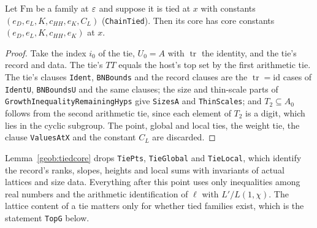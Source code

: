 \begin{lemma}\label{geob:tiedcore}
Let $\mathrm{Fm}$ be a family at $\varepsilon$ and suppose it is tied at $x$ with
constants $(e_D,e_L,K,c_{HH},e_K,C_L)$ (\texttt{ChainTied}). Then its core has
core constants $(e_D,e_L,K,c_{HH},e_K)$ at $x$.
\end{lemma}
\begin{proof}
Take the index $i_0$ of the tie, $U_0=A$ with $\operatorname{tr}$ the identity,
and the tie's record and data. The tie's $TT$ equals the host's top set by the
first arithmetic tie. The tie's clauses \texttt{Ident}, \texttt{BNBounds} and
the record clauses are the $\operatorname{tr}=\mathrm{id}$ cases of
\texttt{IdentU}, \texttt{BNBoundsU} and the same clauses; the size and
thin-scale parts of \texttt{GrowthInequalityRemainingHyps} give \texttt{SizesA}
and \texttt{ThinScales}; and $T_2\subseteq A_0$ follows from the second
arithmetic tie, since each element of $T_2$ is a digit, which lies in the cyclic
subgroup. The point, global and local ties, the weight tie, the clause
\texttt{ValuesAtX} and the constant $C_L$ are discarded.
\end{proof}

\begin{remark}
Lemma~\ref{geob:tiedcore} drops \texttt{TiePts}, \texttt{TieGlobal} and
\texttt{TieLocal}, which identify the record's ranks, slopes, heights and local
sums with invariants of actual lattices and size data. Everything after this
point uses only inequalities among real numbers and the arithmetic identification
of $\ell$ with $L'/L(1,\chi)$. The lattice content of a tie matters only for
whether tied families exist, which is the statement \texttt{TopG} below.
\end{remark}

